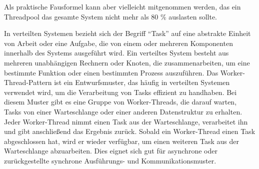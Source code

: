 Als praktische Fausformel kann aber vielleicht mitgenommen werden, das ein Threadpool das gesamte System nicht mehr als 80 \% auslasten sollte. 

In verteilten Systemen bezieht sich der Begriff \enquote{Task} auf eine abstrakte Einheit von Arbeit oder eine Aufgabe, die von einem oder mehreren Komponenten innerhalb des Systems ausgeführt wird. Ein verteiltes System besteht aus mehreren unabhängigen Rechnern oder Knoten, die zusammenarbeiten, um eine bestimmte Funktion oder einen bestimmten Prozess auszuführen. Das Worker-Thread-Pattern ist ein Entwurfsmuster, das häufig in verteilten Systemen verwendet wird, um die Verarbeitung von Tasks effizient zu handhaben. Bei diesem Muster gibt es eine Gruppe von Worker-Threads, die darauf warten, Tasks von einer Warteschlange oder einer anderen Datenstruktur zu erhalten. Jeder Worker-Thread nimmt einen Task aus der Warteschlange, verarbeitet ihn und gibt anschließend das Ergebnis zurück. Sobald ein Worker-Thread einen Task abgeschlossen hat, wird er wieder verfügbar, um einen weiteren Task aus der Warteschlange abzuarbeiten. Dies eignet sich gut für asynchrone oder zurückgestellte synchrone Ausführungs- und Kommunikationsmuster. 

